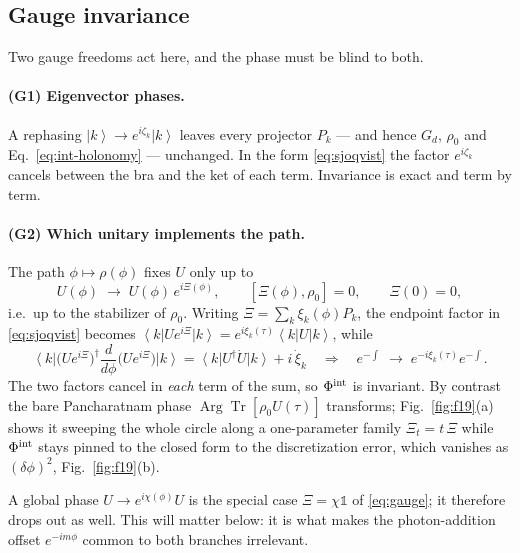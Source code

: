 \documentclass[11pt]{article}
\newcommand{\ket}[1]{\left|#1\right\rangle}
\newcommand{\bra}[1]{\left\langle#1\right|}
\newcommand{\Tr}{\operatorname{Tr}}
\newcommand{\Arg}{\operatorname{Arg}}
\begin{document}
\subsection{Gauge invariance}
\label{sec:int-gauge}

Two gauge freedoms act here, and the phase must be blind to both.

\paragraph{(G1) Eigenvector phases.} A rephasing $\ket{k}\to e^{i\zeta_k}\ket{k}$
leaves every projector $P_k$ --- and hence $G_d$, $\rho_0$ and
Eq.~\eqref{eq:int-holonomy} --- unchanged. In the form \eqref{eq:sjoqvist} the
factor $e^{i\zeta_k}$ cancels between the bra and the ket of each term.
Invariance is exact and term by term.

\paragraph{(G2) Which unitary implements the path.} The path
$\phi\mapsto\rho(\phi)$ fixes $U$ only up to
\begin{equation}
U(\phi)\;\longrightarrow\;U(\phi)\,e^{i\Xi(\phi)},\qquad
[\Xi(\phi),\rho_0]=0,\qquad \Xi(0)=0 ,
\label{eq:gauge}
\end{equation}
i.e.\ up to the stabilizer of $\rho_0$. Writing
$\Xi=\sum_k\xi_k(\phi)P_k$, the endpoint factor in \eqref{eq:sjoqvist} becomes
$\bra{k}Ue^{i\Xi}\ket{k}=e^{i\xi_k(\tau)}\bra{k}U\ket{k}$, while
\begin{equation}
\bra{k}\big(Ue^{i\Xi}\big)^\dagger\frac{d}{d\phi}\big(Ue^{i\Xi}\big)\ket{k}
=\bra{k}U^\dagger\dot U\ket{k}+i\,\dot\xi_k
\quad\Longrightarrow\quad
e^{-\int}\;\longrightarrow\;e^{-i\xi_k(\tau)}e^{-\int} .
\end{equation}
The two factors cancel in \emph{each} term of the sum, so $\Phi^{\rm int}$ is
invariant. By contrast the bare Pancharatnam phase $\Arg\Tr[\rho_0U(\tau)]$
transforms; Fig.~\ref{fig:f19}(a) shows it sweeping the whole circle along a
one-parameter family $\Xi_t=t\,\Xi$ while $\Phi^{\rm int}$ stays pinned to the
closed form to the discretization error, which vanishes as $(\delta\phi)^2$,
Fig.~\ref{fig:f19}(b).

A global phase $U\to e^{i\chi(\phi)}U$ is the special case
$\Xi=\chi\mathbb 1$ of \eqref{eq:gauge}; it therefore drops out as well. This
will matter below: it is what makes the photon-addition offset $e^{-im\phi}$
common to both branches irrelevant.
\end{document}
